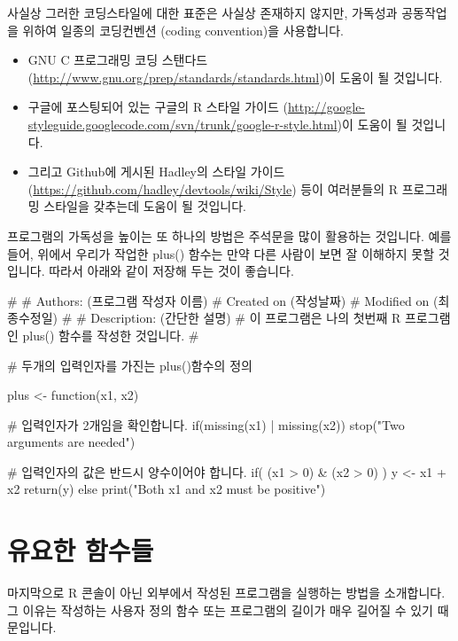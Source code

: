 \documentclass{book}
\begin{document}
사실상 그러한 코딩스타일에 대한 표준은 사실상 존재하지 않지만, 가독성과 공동작업을 위하여 일종의 코딩컨벤션 (coding convention)을 사용합니다. 
\begin{itemize}
\item GNU C 프로그래밍 코딩 스탠다드 (\url{http://www.gnu.org/prep/standards/standards.html})이 도움이 될 것입니다. 
\item 구글에 포스팅되어 있는 구글의 R 스타일 가이드 (\url{http://google-styleguide.googlecode.com/svn/trunk/google-r-style.html})이 도움이 될 것입니다. 
\item 그리고 Github에 게시된 Hadley의 스타일 가이드 (\url{https://github.com/hadley/devtools/wiki/Style}) 등이 여러분들의 R 프로그래밍 스타일을 갖추는데 도움이 될 것입니다. 
\end{itemize}

프로그램의 가독성을 높이는 또 하나의 방법은 주석문을 많이 활용하는 것입니다.
예를들어, 위에서 우리가 작업한 plus() 함수는 만약 다른 사람이 보면 잘 이해하지 못할 것입니다. 
따라서 아래와 같이 저장해 두는 것이 좋습니다.

\begin{Schunk}
\begin{Soutput}
# 
# Authors: (프로그램 작성자 이름)
# Created on (작성날짜) 
# Modified on (최종수정일)
# 
# Description: (간단한 설명)
# 이 프로그램은 나의 첫번째 R 프로그램인 plus() 함수를 작성한 것입니다.
# 

# 두개의 입력인자를 가진는 plus()함수의 정의 

plus <- function(x1, x2){

	# 입력인자가 2개임을 확인합니다.
	if(missing(x1) | missing(x2)) stop("Two arguments are needed")
	
	# 입력인자의 값은 반드시 양수이어야 합니다. 
	if( (x1 > 0) & (x2 > 0) ){
		y <- x1 + x2
		return(y)
	}
	else print("Both x1 and x2 must be positive")
}
\end{Soutput}
\end{Schunk}



\section{유요한 함수들} 

마지막으로 R 콘솔이 아닌 외부에서 작성된 프로그램을 실행하는 방법을 소개합니다. 
그 이유는 작성하는 사용자 정의 함수 또는 프로그램의 길이가 매우 길어질 수 있기 때문입니다. 
\end{document}
